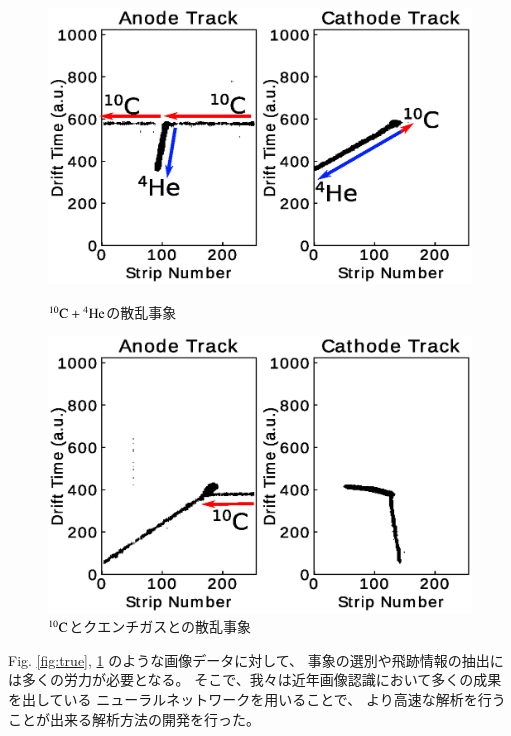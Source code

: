 \documentclass{jps-cp}
\begin{document}
\begin{figure}
  \centering
  \begin{minipage}{0.4\columnwidth}
    \centering
    \includegraphics[clip, width=0.9\columnwidth]{eps/true.eps}
    \caption{${}^{10}\rm{C}+{}^{4}\rm{He}$の散乱事象}
    \label{fig:true}
  \end{minipage}
  \begin{minipage}{0.4\columnwidth}
    \centering
    \includegraphics[clip, width=0.9\columnwidth]{eps/false.eps}
    \caption{${}^{10}\rm{C}$とクエンチガスとの散乱事象}
    \label{fig:false}
  \end{minipage}
\end{figure}

Fig. \ref{fig:true}, \ref{fig:false} のような画像データに対して、
事象の選別や飛跡情報の抽出には多くの労力が必要となる。
そこで、我々は近年画像認識において多くの成果を出している
ニューラルネットワークを用いることで、
より高速な解析を行うことが出来る解析方法の開発を行った。
\end{document}

